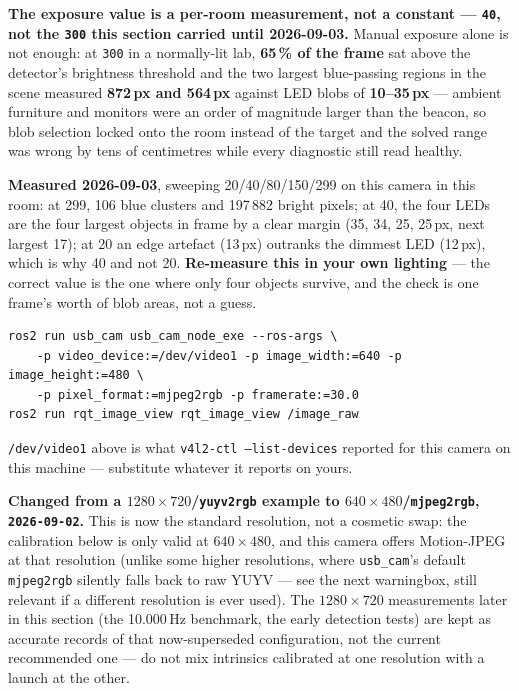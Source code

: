 \documentclass[11pt]{report}
\newenvironment{warningbox}%
  {\begin{lrbox}{\warnbox}\begin{minipage}{0.90\textwidth}}%
  {\end{minipage}\end{lrbox}%
   \begin{center}\fcolorbox{black}{codebg}{\usebox{\warnbox}}\end{center}}
\begin{document}
\begin{warningbox}
\textbf{The exposure value is a per-room measurement, not a constant ---
\texttt{40}, not the \texttt{300} this section carried until 2026-09-03.}
Manual exposure alone is not enough: at \texttt{300} in a normally-lit lab,
\textbf{65\,\% of the frame} sat above the detector's brightness threshold
and the two largest blue-passing regions in the scene measured
\textbf{872\,px and 564\,px} against LED blobs of \textbf{10--35\,px} ---
ambient furniture and monitors were an order of magnitude larger than the
beacon, so blob selection locked onto the room instead of the target and the
solved range was wrong by tens of centimetres while every diagnostic still
read healthy.

\textbf{Measured 2026-09-03}, sweeping 20/40/80/150/299 on this camera in
this room: at 299, 106 blue clusters and 197\,882 bright pixels; at 40, the
four LEDs are the four largest objects in frame by a clear margin (35, 34,
25, 25\,px, next largest 17); at 20 an edge artefact (13\,px) outranks the
dimmest LED (12\,px), which is why 40 and not 20. \textbf{Re-measure this in
your own lighting} --- the correct value is the one where only four objects
survive, and the check is one frame's worth of blob areas, not a guess.
\end{warningbox}

\begin{lstlisting}[style=shell]
ros2 run usb_cam usb_cam_node_exe --ros-args \
    -p video_device:=/dev/video1 -p image_width:=640 -p image_height:=480 \
    -p pixel_format:=mjpeg2rgb -p framerate:=30.0
ros2 run rqt_image_view rqt_image_view /image_raw
\end{lstlisting}

\texttt{/dev/video1} above is what \texttt{v4l2-ctl --list-devices} reported
for this camera on this machine --- substitute whatever it reports on yours.

\begin{warningbox}
\textbf{Changed from a $1280\times720$/\texttt{yuyv2rgb} example to
$640\times480$/\texttt{mjpeg2rgb}, \texttt{2026-09-02}.} This is now the
standard resolution, not a cosmetic swap: the calibration below is only
valid at $640\times480$, and this camera offers Motion-JPEG at that
resolution (unlike some higher resolutions, where \texttt{usb\_cam}'s
default \texttt{mjpeg2rgb} silently falls back to raw YUYV --- see the next
warningbox, still relevant if a different resolution is ever used). The
$1280\times720$ measurements later in this section (the 10.000\,Hz
benchmark, the early detection tests) are kept as accurate records of that
now-superseded configuration, not the current recommended one --- do not
mix intrinsics calibrated at one resolution with a launch at the other.
\end{warningbox}
\end{document}
